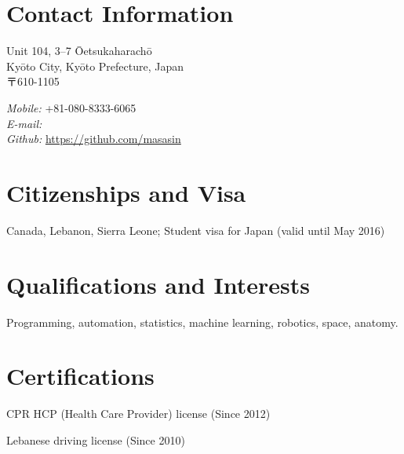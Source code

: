 \documentclass[10pt, a4paper]{article}
\begin{document}
\thispagestyle{plain}

\section{Contact Information}

\vspace{0.14cm}
\begin{minipage}{0.5\textwidth}
Unit 104, 3--7 Ōetsukaharachō\\
Kyōto City, Kyōto Prefecture, Japan\\
〒610-1105
\end{minipage}
\begin{minipage}{0.5\textwidth}
  \flushright
  \emph{Mobile:} +81-080-8333-6065\\
  \emph{E-mail:} \\
  \emph{Github:} \url{https://github.com/masasin}
\end{minipage}

\section{Citizenships and Visa}
Canada, Lebanon, Sierra Leone; Student visa for Japan (valid until May 2016)

\section{Qualifications and Interests}
Programming, automation, statistics, machine learning, robotics, space, anatomy.

\section{Certifications}
\begin{innerlist}
  \item CPR HCP (Health Care Provider) license (Since 2012)
  \item Lebanese driving license (Since 2010)
\end{innerlist}
\end{document}
